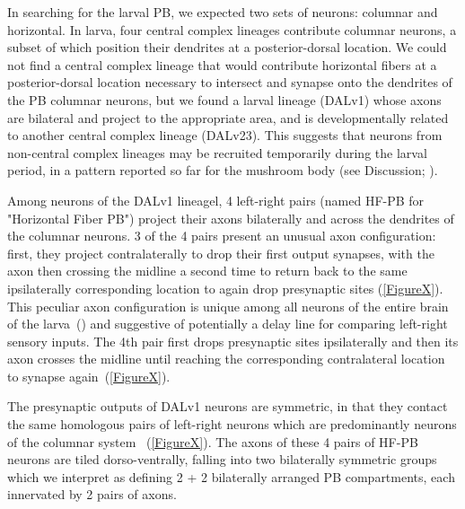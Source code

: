 In searching for the larval PB, we expected two sets of neurons: columnar and horizontal. In larva, four central complex lineages contribute columnar neurons, a subset of which position their dendrites at a posterior-dorsal location. We could not find a central complex lineage that would contribute horizontal fibers at a posterior-dorsal location necessary to intersect and synapse onto the dendrites of the PB columnar neurons, but we found a larval lineage (DALv1) whose axons are bilateral and project to the appropriate area, and is developmentally related to another central complex lineage (DALv23). This suggests that neurons from non-central complex lineages may be recruited temporarily during the larval period, in a pattern reported so far for the mushroom body (see Discussion; \citep{truman2023metamorphosis}). 



Among neurons of the DALv1 lineagel, 4 left-right pairs (named HF-PB for "Horizontal Fiber PB") project their axons bilaterally and across the dendrites of the columnar neurons.
3 of the 4 pairs present an unusual axon configuration: first, they project contralaterally to drop their first output synapses, with the axon then crossing the midline a second time to return back to the same ipsilaterally corresponding location to again drop presynaptic sites (\ref{FigureX}).
This peculiar axon configuration is unique among all neurons of the entire brain of the larva~(\citep{winding2023}) and suggestive of potentially a delay line for comparing left-right sensory inputs.
The 4th pair first drops presynaptic sites ipsilaterally and then its axon crosses the midline until reaching the corresponding contralateral location to synapse again~(\ref{FigureX}).


The presynaptic outputs of DALv1 neurons are symmetric, in that they contact the same homologous pairs of left-right neurons which are predominantly neurons of the columnar system ~(\ref{FigureX}).
The axons of these 4 pairs of HF-PB neurons are tiled dorso-ventrally, falling into two bilaterally symmetric groups which we interpret as defining 2 + 2 bilaterally arranged PB compartments, each innervated by 2 pairs of axons. %

